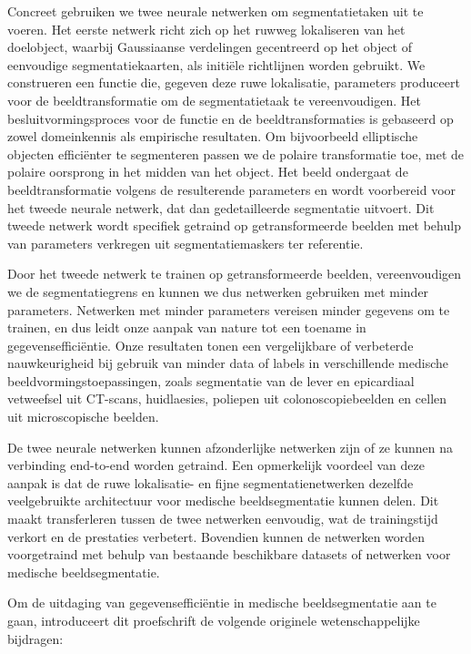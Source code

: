 Concreet gebruiken we twee neurale netwerken om segmentatietaken uit te voeren. Het eerste netwerk richt zich op het ruwweg lokaliseren van het doelobject, waarbij Gaussiaanse verdelingen gecentreerd op het object of eenvoudige segmentatiekaarten, als initiële richtlijnen worden gebruikt. We construeren een functie die, gegeven deze ruwe lokalisatie, parameters produceert voor de beeldtransformatie om de segmentatietaak te vereenvoudigen. Het besluitvormingsproces voor de functie en de beeldtransformaties is gebaseerd op zowel domeinkennis als empirische resultaten. Om bijvoorbeeld elliptische objecten efficiënter te segmenteren passen we de polaire transformatie toe, met de polaire oorsprong in het midden van het object. Het beeld ondergaat de beeldtransformatie volgens de resulterende parameters en wordt voorbereid voor het tweede neurale netwerk, dat dan gedetailleerde segmentatie uitvoert. Dit tweede netwerk wordt specifiek getraind op getransformeerde beelden met behulp van parameters verkregen uit segmentatiemaskers ter referentie.

Door het tweede netwerk te trainen op getransformeerde beelden, vereenvoudigen we de segmentatiegrens en kunnen we dus netwerken gebruiken met minder parameters. Netwerken met minder parameters vereisen minder gegevens om te trainen, en dus leidt onze aanpak van nature tot een toename in gegevensefficiëntie. Onze resultaten tonen een vergelijkbare of verbeterde nauwkeurigheid bij gebruik van minder data of labels in verschillende medische beeldvormingstoepassingen, zoals segmentatie van de lever en epicardiaal vetweefsel uit CT-scans, huidlaesies, poliepen uit colonoscopiebeelden en cellen uit microscopische beelden.

De twee neurale netwerken kunnen afzonderlijke netwerken zijn of ze kunnen na verbinding end-to-end worden getraind. Een opmerkelijk voordeel van deze aanpak is dat de ruwe lokalisatie- en fijne segmentatienetwerken dezelfde veelgebruikte architectuur voor medische beeldsegmentatie kunnen delen. Dit maakt transferleren tussen de twee netwerken eenvoudig, wat de trainingstijd verkort en de prestaties verbetert. Bovendien kunnen de netwerken worden voorgetraind met behulp van bestaande beschikbare datasets of netwerken voor medische beeldsegmentatie.

Om de uitdaging van gegevensefficiëntie in medische beeldsegmentatie aan te gaan, introduceert dit proefschrift de volgende originele wetenschappelijke bijdragen:

